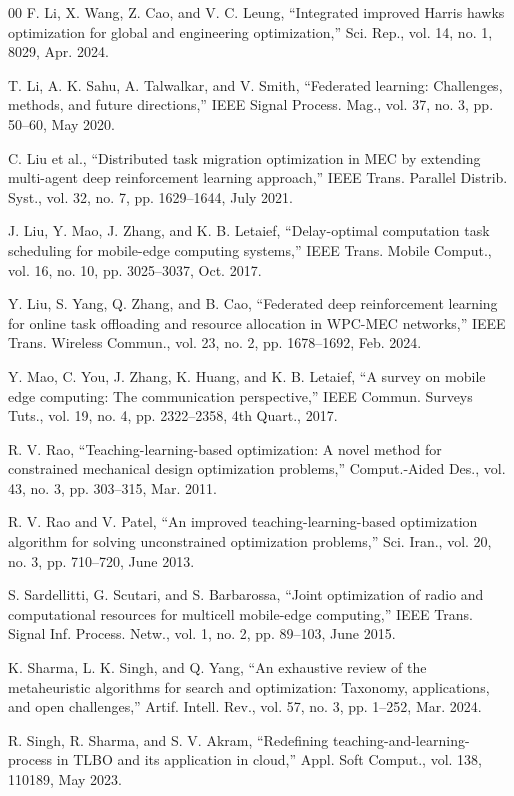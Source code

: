\documentclass[conference]{IEEEtran}
\begin{document}
\begin{thebibliography}{00}
 F. Li, X. Wang, Z. Cao, and V. C. Leung, ``Integrated improved Harris hawks optimization for global and engineering optimization,'' Sci. Rep., vol. 14, no. 1, 8029, Apr. 2024.

 T. Li, A. K. Sahu, A. Talwalkar, and V. Smith, ``Federated learning: Challenges, methods, and future directions,'' IEEE Signal Process. Mag., vol. 37, no. 3, pp. 50--60, May 2020.

 C. Liu et al., ``Distributed task migration optimization in MEC by extending multi-agent deep reinforcement learning approach,'' IEEE Trans. Parallel Distrib. Syst., vol. 32, no. 7, pp. 1629--1644, July 2021.

 J. Liu, Y. Mao, J. Zhang, and K. B. Letaief, ``Delay-optimal computation task scheduling for mobile-edge computing systems,'' IEEE Trans. Mobile Comput., vol. 16, no. 10, pp. 3025--3037, Oct. 2017.

 Y. Liu, S. Yang, Q. Zhang, and B. Cao, ``Federated deep reinforcement learning for online task offloading and resource allocation in WPC-MEC networks,'' IEEE Trans. Wireless Commun., vol. 23, no. 2, pp. 1678--1692, Feb. 2024.

 Y. Mao, C. You, J. Zhang, K. Huang, and K. B. Letaief, ``A survey on mobile edge computing: The communication perspective,'' IEEE Commun. Surveys Tuts., vol. 19, no. 4, pp. 2322--2358, 4th Quart., 2017.

 R. V. Rao, ``Teaching-learning-based optimization: A novel method for constrained mechanical design optimization problems,'' Comput.-Aided Des., vol. 43, no. 3, pp. 303--315, Mar. 2011.

 R. V. Rao and V. Patel, ``An improved teaching-learning-based optimization algorithm for solving unconstrained optimization problems,'' Sci. Iran., vol. 20, no. 3, pp. 710--720, June 2013.

 S. Sardellitti, G. Scutari, and S. Barbarossa, ``Joint optimization of radio and computational resources for multicell mobile-edge computing,'' IEEE Trans. Signal Inf. Process. Netw., vol. 1, no. 2, pp. 89--103, June 2015.

 K. Sharma, L. K. Singh, and Q. Yang, ``An exhaustive review of the metaheuristic algorithms for search and optimization: Taxonomy, applications, and open challenges,'' Artif. Intell. Rev., vol. 57, no. 3, pp. 1--252, Mar. 2024.

 R. Singh, R. Sharma, and S. V. Akram, ``Redefining teaching-and-learning-process in TLBO and its application in cloud,'' Appl. Soft Comput., vol. 138, 110189, May 2023.


\end{thebibliography}
\end{document}
